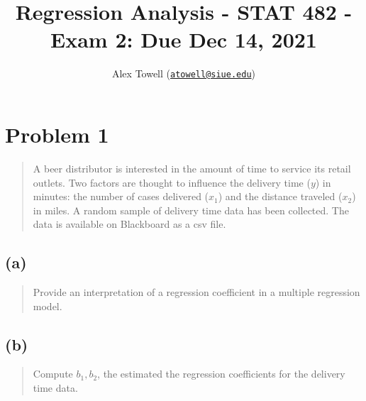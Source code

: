 \documentclass[
]{article}
\title{Regression Analysis - STAT 482 - Exam 2: Due Dec 14, 2021}
\author{Alex Towell
(\href{mailto:atowell@siue.edu}{\nolinkurl{atowell@siue.edu}})}
\date{}
\begin{document}
\maketitle

\newcommand{\sos}[1]{\mathrm{SS_{#1}}}
\newcommand{\ms}[1]{\mathrm{MS_{#1}}}
\newcommand{\sd}{\operatorname{sd}}
\newcommand{\var}{\operatorname{var}}
\newcommand{\expect}{\operatorname{E}}
\newcommand{\corr}{\operatorname{cor}}
\newcommand{\cov}{\operatorname{cov}}
\newcommand{\se}{\operatorname{se}}
\newcommand{\eval}[2]{\left. #1 \right\vert_{#2}}
\newcommand{\degf}[1]{\mathrm{df_{#1}}}
\newcommand{\entropy}{\operatorname{H}}
\newcommand{\param}[1]{\textcolor{blue}{\texttt{#1}}}
\newcommand{\ci}{\operatorname{CI}}

\hypertarget{problem-1}{%
\section{Problem 1}\label{problem-1}}

\begin{quote}
A beer distributor is interested in the amount of time to service its
retail outlets. Two factors are thought to influence the delivery time
(\(y\)) in minutes: the number of cases delivered (\(x_1\)) and the
distance traveled (\(x_2\)) in miles. A random sample of delivery time
data has been collected. The data is available on Blackboard as a csv
file.
\end{quote}

\vspace{50pt}

\hypertarget{a}{%
\subsection{(a)}\label{a}}

\begin{quote}
Provide an interpretation of a regression coefficient in a multiple
regression model.
\end{quote}

\vspace{50pt}

\hypertarget{b}{%
\subsection{(b)}\label{b}}

\begin{quote}
Compute \(b_1,b_2\), the estimated the regression coefficients for the
delivery time data.
\end{quote}
\end{document}
